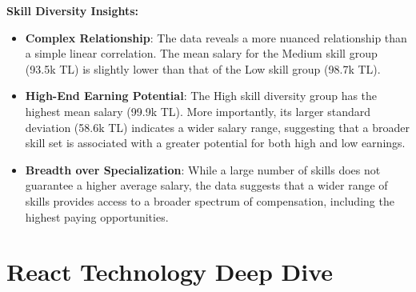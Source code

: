 \documentclass[12pt,a4paper]{article}
\begin{document}
\textbf{Skill Diversity Insights:}
\begin{itemize}
	\item \textbf{Complex Relationship}: The data reveals a more nuanced relationship than a simple linear correlation. The mean salary for the Medium skill group (93.5k TL) is slightly lower than that of the Low skill group (98.7k TL).
	\item \textbf{High-End Earning Potential}: The High skill diversity group has the highest mean salary (99.9k TL). More importantly, its larger standard deviation (58.6k TL) indicates a wider salary range, suggesting that a broader skill set is associated with a greater potential for both high and low earnings.
	\item \textbf{Breadth over Specialization}: While a large number of skills does not guarantee a higher average salary, the data suggests that a wider range of skills provides access to a broader spectrum of compensation, including the highest paying opportunities.
\end{itemize}

\section{React Technology Deep Dive}
\end{document}

